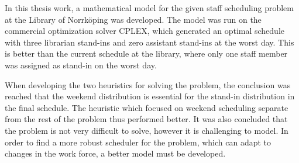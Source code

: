 In this thesis work, a mathematical model for the given staff scheduling problem at the Library of Norrköping was developed. The model was run on the commercial optimization solver CPLEX, which generated an optimal schedule with three librarian stand-ins and zero assistant stand-ins at the worst day. This is better than the current schedule at the library, where only one staff member was assigned as stand-in on the worst day.

When developing the two heuristics for solving the problem, the conclusion was reached that the weekend distribution is essential for the stand-in distribution in the final schedule. The heuristic which focused on weekend scheduling separate from the rest of the problem thus performed better. It was also concluded that the problem is not very difficult to solve, however it is challenging to model. In order to find a more robust scheduler for the problem, which can adapt to changes in the work force, a better model must be developed.



